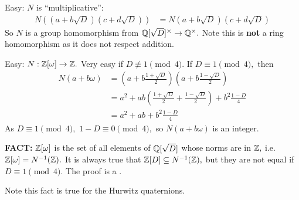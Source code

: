 \documentclass[a4paper]{article}
\begin{document}
Easy: $N$ is ``multiplicative'':
\begin{align}
    N((a+b\sqrt D)(c+d\sqrt D))&=N(a+b\sqrt D)(c+d\sqrt D)
\end{align}
So $N$ is a group homomorphism from $\mathbb{Q}[\sqrt D]^\times\to\mathbb{Q}^\times.$ Note this is \textbf{not} a ring homomorphism as it does not respect addition.

Easy: $N:\mathbb{Z}[\omega]\to\mathbb{Z}.$ Very easy if $D\not\equiv 1\pmod 4.$ If $D\equiv 1\pmod4,$ then \begin{align}
    N(a+b\omega)&=\left(a+b\frac{1+\sqrt D}{2}\right)\left(a+b\frac{1-\sqrt D}{2}\right)\\
    &=a^2+ab\left(\frac{1+\sqrt D}{2}+\frac{1-\sqrt D}{2}\right)+b^2\frac{1-D}{4}\\
    &=a^2+ab+b^2\frac{1-D}{4}
\end{align} 
As $D\equiv 1\pmod 4,$ $1-D\equiv 0\pmod 4,$ so $N(a+b\omega)$ is an integer.

\textbf{FACT:} $\mathbb{Z}[\omega]$ is the set of all elements of $\mathbb{Q}[\sqrt D]$ whose norms are in $\mathbb{Z},$ i.e. $\mathbb{Z}[\omega]=N^{-1}(\mathbb{Z}).$ It is always true that $\mathbb{Z}[D]\subseteq N^{-1}(\mathbb{Z}),$ but they are not equal if $D\equiv1\pmod4.$ The proof is a .

Note this fact is true for the Hurwitz quaternions.
\end{document}
